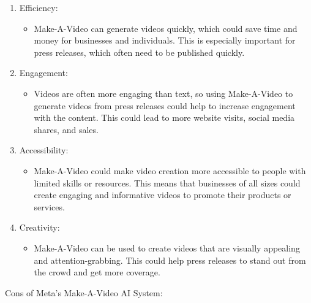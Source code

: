 \documentclass[12pt]{article}
\begin{document}
\begin{enumerate}
\item Efficiency:
\begin{itemize}
\item Make-A-Video can generate videos quickly, which could save time and money for businesses and individuals. This is especially important for press releases, which often need to be published quickly.
\end{itemize}

\item Engagement:
\begin{itemize}
\item  Videos are often more engaging than text, so using Make-A-Video to generate videos from press releases could help to increase engagement with the content. This could lead to more website visits, social media shares, and sales.

\end{itemize}

\item Accessibility: 
\begin{itemize}
\item Make-A-Video could make video creation more accessible to people with limited skills or resources. This means that businesses of all sizes could create engaging and informative videos to promote their products or services.

\end{itemize}

\item Creativity: 
\begin{itemize}
\item Make-A-Video can be used to create videos that are visually appealing and attention-grabbing. This could help press releases to stand out from the crowd and get more coverage.

\end{itemize}

\end{enumerate}
\pagebreak{}
\justify
Cons of Meta's Make-A-Video AI System:
\end{document}

